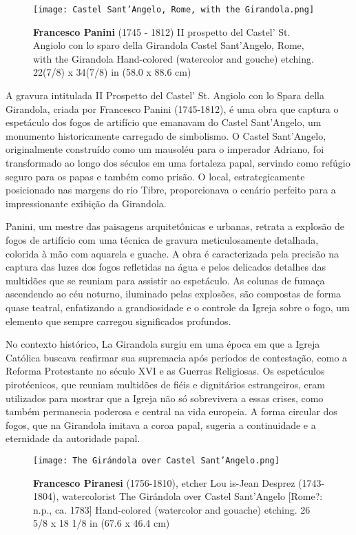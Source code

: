 \begin{figure}[htbp]
  \centering
  \texttt{[image: Castel Sant'Angelo, Rome, with the Girandola.png]}
  \caption{\fontsize{8}{8}\selectfont \textbf{Francesco Panini} (1745 - 1812) II prospetto del Castel' St. Angiolo con lo sparo della Girandola Castel Sant'Angelo, Rome, with the Girandola Hand-colored (watercolor and gouche) etching. 22(7/8) x 34(7/8) in (58.0 x 88.6 cm)}
  \label{fig:Castel_sant_angelo}
\end{figure}

A gravura intitulada II Prospetto del Castel' St. Angiolo con lo Spara della Girandola, criada por Francesco Panini (1745-1812), é uma obra que captura o espetáculo dos fogos de artifício que emanavam do Castel Sant'Angelo, um monumento historicamente carregado de simbolismo. O Castel Sant'Angelo, originalmente construído como um mausoléu para o imperador Adriano, foi transformado ao longo dos séculos em uma fortaleza papal, servindo como refúgio seguro para os papas e também como prisão. O local, estrategicamente posicionado nas margens do rio Tibre, proporcionava o cenário perfeito para a impressionante exibição da Girandola.

Panini, um mestre das paisagens arquitetônicas e urbanas, retrata a explosão de fogos de artifício com uma técnica de gravura meticulosamente detalhada, colorida à mão com aquarela e guache. A obra é caracterizada pela precisão na captura das luzes dos fogos refletidas na água e pelos delicados detalhes das multidões que se reuniam para assistir ao espetáculo. As colunas de fumaça ascendendo ao céu noturno, iluminado pelas explosões, são compostas de forma quase teatral, enfatizando a grandiosidade e o controle da Igreja sobre o fogo, um elemento que sempre carregou significados profundos.

No contexto histórico, La Girandola surgiu em uma época em que a Igreja Católica buscava reafirmar sua supremacia após períodos de contestação, como a Reforma Protestante no século XVI e as Guerras Religiosas. Os espetáculos pirotécnicos, que reuniam multidões de fiéis e dignitários estrangeiros, eram utilizados para mostrar que a Igreja não só sobrevivera a essas crises, como também permanecia poderosa e central na vida europeia. A forma circular dos fogos, que na Girandola imitava a coroa papal, sugeria a continuidade e a eternidade da autoridade papal.

\begin{wrapfigure}{r}{0.4\textwidth} %
    \centering
    \texttt{[image: The Girándola over Castel Sant'Angelo.png]}
    \caption{\fontsize{8}{8}\selectfont \textbf{Francesco Piranesi} (1756-1810), etcher  Lou is-Jean Desprez (1743-1804), watercolorist The Girándola over Castel Sant'Angelo [Rome?: n.p., ca. 1783] Hand-colored (watercolor and gouache) etching. 26 5/8 x 18 1/8 in (67.6 x 46.4 cm) }
\end{wrapfigure}

